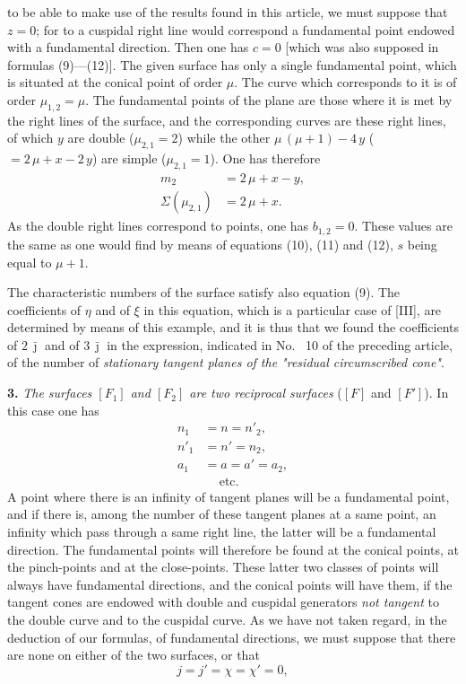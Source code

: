 \documentclass{article}
\begin{document}
to be able to make use of the results found in this article, we must suppose that $z = 0$; for to a cuspidal right line would correspond a fundamental point endowed with a fundamental direction. Then one has $c = 0$ [which was also supposed in formulas (9)---(12)]. The given surface has only a single fundamental point, which is situated at the conical point of order $\mu$. The curve which corresponds to it is of order $\mu_{1, 2} = \mu$. The fundamental points of the plane are those where it is met by the right lines of the surface, and the corresponding curves are these right lines, of which $y$ are double ($\mu_{2, 1} = 2$) while the other $\mu\,(\mu + 1) - 4\,y$ ($= 2\,\mu + x - 2\,y$) are simple ($\mu_{2, 1} = 1$). One has therefore
\[
\begin{aligned}
m_2 &= 2\,\mu + x - y, \\
\Sigma(\mu_{2, 1}) &= 2\,\mu + x.
\end{aligned}
\]
As the double right lines correspond to points, one has $b_{1, 2} = 0$. These values are the same as one would find by means of equations (10), (11) and (12), $s$ being equal to $\mu + 1$.

The characteristic numbers of the surface satisfy also equation (9). The coefficients of $\eta$ and of $\xi$ in this equation, which is a particular case of [III], are determined by means of this example, and it is thus that we found the coefficients of $2\,\bar{\jmath}$ and of $3\,\bar{\jmath}$ in the expression, indicated in No.~ 10 of the preceding article, of the number of \emph{stationary tangent planes of the "residual circumscribed cone"}.

\textbf{3.} \emph{The surfaces $[F_1]$ and $[F_2]$ are two reciprocal surfaces} ($[F]$ and $[F']$). In this case one has
\[
\begin{aligned}
n_1 &= n = n'_2, \\
n'_1 &= n' = n_2, \\
a_1 &= a = a' = a_2, \\
&\quad\ \text{etc.}
\end{aligned}
\]
A point where there is an infinity of tangent planes will be a fundamental point, and if there is, among the number of these tangent planes at a same point, an infinity which pass through a same right line, the latter will be a fundamental direction. The fundamental points will therefore be found at the conical points, at the pinch-points and at the close-points. These latter two classes of points will always have fundamental directions, and the conical points will have them, if the tangent cones are endowed with double and cuspidal generators \emph{not tangent} to the double curve and to the cuspidal curve. As we have not taken regard, in the deduction of our formulas, of fundamental directions, we must suppose that there are none on either of the two surfaces, or that
\[
j = j' = \chi = \chi' = 0,
\]
\end{document}
